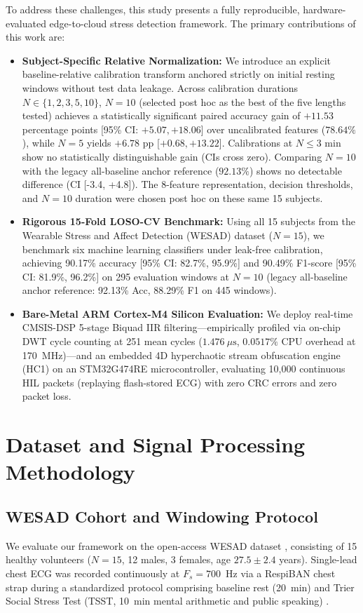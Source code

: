 \documentclass[conference]{IEEEtran}
\begin{document}
To address these challenges, this study presents a fully reproducible, hardware-evaluated edge-to-cloud stress detection framework. The primary contributions of this work are:
\begin{itemize}
    \item \textbf{Subject-Specific Relative Normalization:} We introduce an explicit baseline-relative calibration transform anchored strictly on initial resting windows without test data leakage. Across calibration durations $N \in \{1, 2, 3, 5, 10\}$, $N=10$ (selected post hoc as the best of the five lengths tested) achieves a statistically significant paired accuracy gain of $+11.53$ percentage points [95\% CI: $+5.07, +18.06$] over uncalibrated features ($78.64\%$), while $N=5$ yields $+6.78$ pp [$+0.68, +13.22$]. Calibrations at $N \le 3$ min show no statistically distinguishable gain (CIs cross zero). Comparing $N=10$ with the legacy all-baseline anchor reference ($92.13\%$) shows no detectable difference (CI [-3.4, +4.8]). The 8-feature representation, decision thresholds, and $N=10$ duration were chosen post hoc on these same 15 subjects.
    \item \textbf{Rigorous 15-Fold LOSO-CV Benchmark:} Using all 15 subjects from the Wearable Stress and Affect Detection (WESAD) dataset ($N=15$), we benchmark six machine learning classifiers under leak-free calibration, achieving 90.17\% accuracy [95\% CI: 82.7\%, 95.9\%] and 90.49\% F1-score [95\% CI: 81.9\%, 96.2\%] on 295 evaluation windows at $N=10$ (legacy all-baseline anchor reference: 92.13\% Acc, 88.29\% F1 on 445 windows).
    \item \textbf{Bare-Metal ARM Cortex-M4 Silicon Evaluation:} We deploy real-time CMSIS-DSP 5-stage Biquad IIR filtering—empirically profiled via on-chip DWT cycle counting at 251 mean cycles ($1.476~\mu\text{s}$, $0.0517\%$ CPU overhead at 170~MHz)—and an embedded 4D hyperchaotic stream obfuscation engine (HC1) on an STM32G474RE microcontroller, evaluating 10,000 continuous HIL packets (replaying flash-stored ECG) with zero CRC errors and zero packet loss.
\end{itemize}

\section{Dataset and Signal Processing Methodology}

\subsection{WESAD Cohort and Windowing Protocol}
We evaluate our framework on the open-access WESAD dataset \cite{schmidt2018wesad}, consisting of 15 healthy volunteers ($N=15$, 12 males, 3 females, age $27.5 \pm 2.4$ years). Single-lead chest ECG was recorded continuously at $F_s = 700$~Hz via a RespiBAN chest strap during a standardized protocol comprising baseline rest (20~min) and Trier Social Stress Test (TSST, 10~min mental arithmetic and public speaking) \cite{kirschbaum1993trier}.
\end{document}

